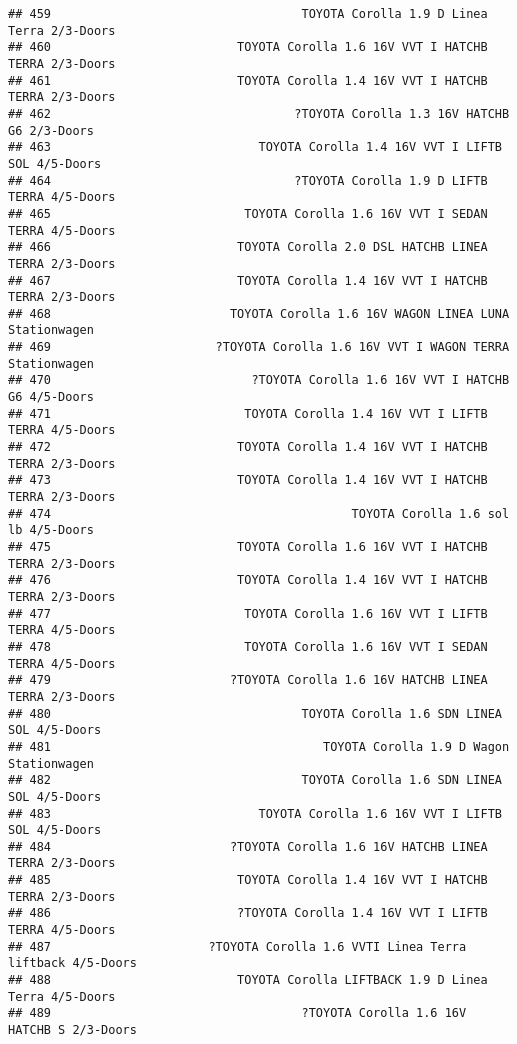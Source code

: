 \documentclass[]{article}
\begin{document}
\begin{verbatim}
## 459                                   TOYOTA Corolla 1.9 D Linea Terra 2/3-Doors
## 460                          TOYOTA Corolla 1.6 16V VVT I HATCHB TERRA 2/3-Doors
## 461                          TOYOTA Corolla 1.4 16V VVT I HATCHB TERRA 2/3-Doors
## 462                                  ?TOYOTA Corolla 1.3 16V HATCHB G6 2/3-Doors
## 463                             TOYOTA Corolla 1.4 16V VVT I LIFTB SOL 4/5-Doors
## 464                                  ?TOYOTA Corolla 1.9 D LIFTB TERRA 4/5-Doors
## 465                           TOYOTA Corolla 1.6 16V VVT I SEDAN TERRA 4/5-Doors
## 466                          TOYOTA Corolla 2.0 DSL HATCHB LINEA TERRA 2/3-Doors
## 467                          TOYOTA Corolla 1.4 16V VVT I HATCHB TERRA 2/3-Doors
## 468                         TOYOTA Corolla 1.6 16V WAGON LINEA LUNA Stationwagen
## 469                       ?TOYOTA Corolla 1.6 16V VVT I WAGON TERRA Stationwagen
## 470                            ?TOYOTA Corolla 1.6 16V VVT I HATCHB G6 4/5-Doors
## 471                           TOYOTA Corolla 1.4 16V VVT I LIFTB TERRA 4/5-Doors
## 472                          TOYOTA Corolla 1.4 16V VVT I HATCHB TERRA 2/3-Doors
## 473                          TOYOTA Corolla 1.4 16V VVT I HATCHB TERRA 2/3-Doors
## 474                                          TOYOTA Corolla 1.6 sol lb 4/5-Doors
## 475                          TOYOTA Corolla 1.6 16V VVT I HATCHB TERRA 2/3-Doors
## 476                          TOYOTA Corolla 1.4 16V VVT I HATCHB TERRA 2/3-Doors
## 477                           TOYOTA Corolla 1.6 16V VVT I LIFTB TERRA 4/5-Doors
## 478                           TOYOTA Corolla 1.6 16V VVT I SEDAN TERRA 4/5-Doors
## 479                         ?TOYOTA Corolla 1.6 16V HATCHB LINEA TERRA 2/3-Doors
## 480                                   TOYOTA Corolla 1.6 SDN LINEA SOL 4/5-Doors
## 481                                      TOYOTA Corolla 1.9 D Wagon Stationwagen
## 482                                   TOYOTA Corolla 1.6 SDN LINEA SOL 4/5-Doors
## 483                             TOYOTA Corolla 1.6 16V VVT I LIFTB SOL 4/5-Doors
## 484                         ?TOYOTA Corolla 1.6 16V HATCHB LINEA TERRA 2/3-Doors
## 485                          TOYOTA Corolla 1.4 16V VVT I HATCHB TERRA 2/3-Doors
## 486                          ?TOYOTA Corolla 1.4 16V VVT I LIFTB TERRA 4/5-Doors
## 487                      ?TOYOTA Corolla 1.6 VVTI Linea Terra liftback 4/5-Doors
## 488                          TOYOTA Corolla LIFTBACK 1.9 D Linea Terra 4/5-Doors
## 489                                   ?TOYOTA Corolla 1.6 16V HATCHB S 2/3-Doors

\end{verbatim}
\end{document}
